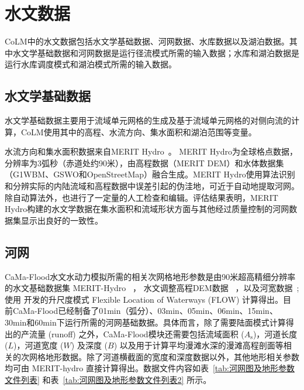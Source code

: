 \section{水文数据}\label{水文数据}

CoLM中的水文数据包括水文学基础数据、河网数据、水库数据以及湖泊数据。其中水文学基础数据和河网数据是运行径流模式所需的输入数据；水库和湖泊数据是运行水库调度模式和湖泊模式所需的输入数据。

\subsection{水文学基础数据}
水文学基础数据主要用于流域单元网格的生成及基于流域单元网格的对侧向流的计算，CoLM使用其中的高程、水流方向、集水面积和湖泊范围等变量。

水流方向和集水面积数据来自MERIT Hydro~\citep{yamazaki2019merit}。 MERIT Hydro为全球格点数据，分辨率为3弧秒（赤道处约90米），由高程数据（MERIT DEM）和水体数据集（G1WBM、GSWO和OpenStreetMap）融合生成。MERIT Hydro使用算法识别和分辨实际的内陆流域和高程数据中误差引起的伪洼地，可近于自动地提取河网。除自动算法外，也进行了一定量的人工检查和编辑。评估结果表明，MERIT Hydro构建的水文学数据在集水面积和流域形状方面与其他经过质量控制的河网数据集显示出良好的一致性。

\subsection{河网}
CaMa-Flood水文水动力模拟所需的相关次网格地形参数是由90米超高精细分辨率的水文基础数据集 MERIT-Hydro ~\citep{yamazaki2019merit}，
水文调整高程DEM数据 ~\citep{yamazaki2017high,yamazaki2012analysis}，以及河宽数据~\citep{yamazaki2014development};
使用 \citet{yamazaki2009deriving} 开发的升尺度模式 Flexible Location of Waterways (FLOW) 计算得出。目前CaMa-Flood已经制备了01min（弧分）、03min、05min、06min、15min、30min和60min下运行所需的河网基础数据。具体而言，除了需要陆面模式计算得出的产流量 (runoff) 之外，CaMa-Flood模块还需要包括流域面积 ($A_{\mathrm {s}} $)，河道长度 ($L$)，河道宽度 ($W$) 及深度 ($B$) 以及用于计算平均漫滩水深的漫滩高程剖面等相关的次网格地形数据。除了河道横截面的宽度和深度数据以外，其他地形相关参数均可由 MERIT-hydro 直接计算得出。数据文件内容如表~\ref{tab:河网图及地形参数文件列表} 和表~\ref{tab:河网图及地形参数文件列表2} 所示。

